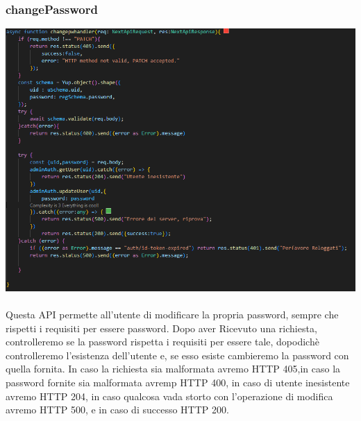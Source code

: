 \documentclass[11pt, a4paper]{article}
\theoremstyle{definition}
\begin{document}
\subsubsection{changePassword}
\includegraphics[width=\textwidth]{materiale/API/ChangePassword.png}
\\\\
Questa API permette all'utente di modificare la propria password, sempre che rispetti i requisiti per essere password.
Dopo aver Ricevuto una richiesta, controlleremo se la password rispetta i requisiti per essere tale, dopodichè controlleremo l'esistenza dell'utente e, se esso esiste cambieremo la password con quella fornita.
In caso la richiesta sia malformata avremo HTTP 405,in caso la password fornite sia malformata avremp HTTP 400, in caso di utente inesistente avremo HTTP 204, in caso qualcosa vada storto con l'operazione di modifica
avremo HTTP 500, e in caso di successo HTTP 200.
\end{document}
